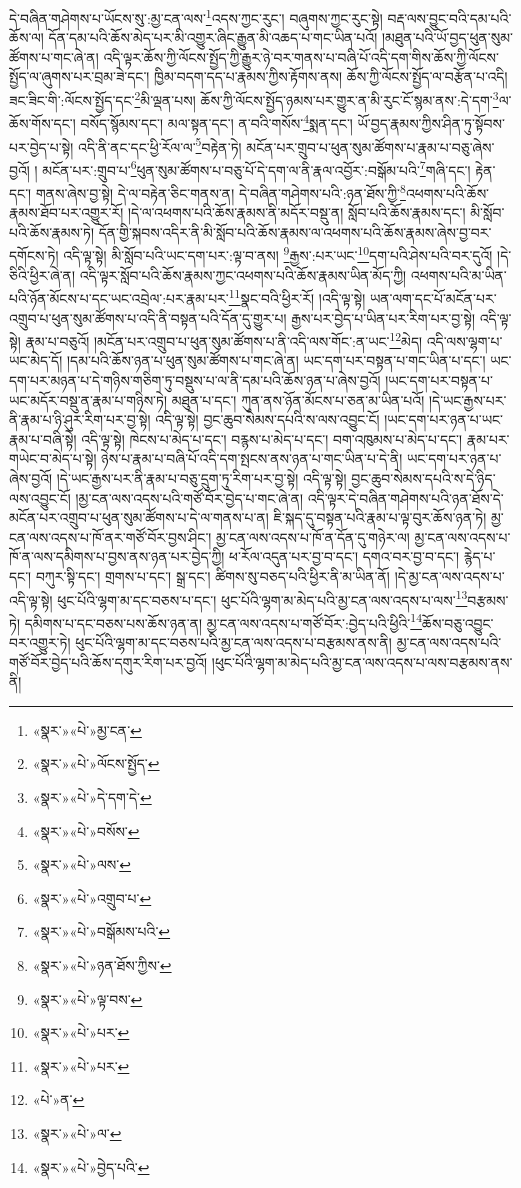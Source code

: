དེ་བཞིན་གཤེགས་པ་ཡོངས་སུ་:མྱ་ངན་ལས་\footnote{«སྣར་»«པེ་»མྱ་ངན་}འདས་ཀྱང་རུང་། བཞུགས་ཀྱང་རུང་སྟེ། བརྡ་ལས་བྱུང་བའི་དམ་པའི་ཆོས་ལ། དོན་དམ་པའི་ཆོས་མེད་པར་མི་འགྱུར་ཞིང་རྒྱུན་མི་འཆད་པ་གང་ཡིན་པའོ། །མཐུན་པའི་ཡོ་བྱད་ཕུན་སུམ་ཚོགས་པ་གང་ཞེ་ན། འདི་ལྟར་ཆོས་ཀྱི་ལོངས་སྤྱོད་ཀྱི་རྒྱུར་ཉེ་བར་གནས་པ་བཞི་པོ་འདི་དག་གིས་ཆོས་ཀྱི་ལོངས་སྤྱོད་ལ་ཞུགས་པར་བྲམ་ཟེ་དང་། ཁྱིམ་བདག་དད་པ་རྣམས་ཀྱིས་རྟོགས་ནས། ཆོས་ཀྱི་ལོངས་སྤྱོད་ལ་བརྩོན་པ་འདི། ཟང་ཟིང་གི་:ལོངས་སྤྱོད་དང་\footnote{«སྣར་»«པེ་»ལོངས་སྤྱོད་}མི་ལྡན་པས། ཆོས་ཀྱི་ལོངས་སྤྱོད་ཉམས་པར་གྱུར་ན་མི་རུང་ངོ་སྙམ་ནས་:དེ་དག་\footnote{«སྣར་»«པེ་»དེ་དག་དེ་}ལ་ཆོས་གོས་དང་། བསོད་སྙོམས་དང་། མལ་སྟན་དང་། ན་བའི་གསོས་\footnote{«སྣར་»«པེ་»བསོས་}སྨན་དང་། ཡོ་བྱད་རྣམས་ཀྱིས་ཤིན་ཏུ་སྟོབས་པར་བྱེད་པ་སྟེ། འདི་ནི་ནང་དང་ཕྱི་རོལ་ལ་\footnote{«སྣར་»«པེ་»ལས་}བརྟེན་ཏེ། མངོན་པར་གྲུབ་པ་ཕུན་སུམ་ཚོགས་པ་རྣམ་པ་བཅུ་ཞེས་བྱའོ། །
མངོན་པར་:གྲུབ་པ་\footnote{«སྣར་»«པེ་»འགྲུབ་པ་}ཕུན་སུམ་ཚོགས་པ་བཅུ་པོ་དེ་དག་ལ་ནི་རྣལ་འབྱོར་:བསྒོམ་པའི་\footnote{«སྣར་»«པེ་»བསྒོམས་པའི་}གཞི་དང་། རྟེན་དང་། གནས་ཞེས་བྱ་སྟེ། དེ་ལ་བརྟེན་ཅིང་གནས་ན། དེ་བཞིན་གཤེགས་པའི་:ཉན་ཐོས་ཀྱི་\footnote{«སྣར་»«པེ་»ཉན་ཐོས་ཀྱིས་}འཕགས་པའི་ཆོས་རྣམས་ཐོབ་པར་འགྱུར་རོ། །དེ་ལ་འཕགས་པའི་ཆོས་རྣམས་ནི་མདོར་བསྡུ་ན། སློབ་པའི་ཆོས་རྣམས་དང་། མི་སློབ་པའི་ཆོས་རྣམས་ཏེ། དོན་གྱི་སྐབས་འདིར་ནི་མི་སློབ་པའི་ཆོས་རྣམས་ལ་འཕགས་པའི་ཆོས་རྣམས་ཞེས་བྱ་བར་དགོངས་ཏེ། འདི་ལྟ་སྟེ། མི་སློབ་པའི་ཡང་དག་པར་:ལྟ་བ་ནས། \footnote{«སྣར་»«པེ་»ལྟ་བས་}རྒྱས་:པར་ཡང་\footnote{«སྣར་»«པེ་»པར་}དག་པའི་ཤེས་པའི་བར་དུའོ། །དེ་ཅིའི་ཕྱིར་ཞེ་ན། འདི་ལྟར་སློབ་པའི་ཆོས་རྣམས་ཀྱང་འཕགས་པའི་ཆོས་རྣམས་ཡིན་མོད་ཀྱི། འཕགས་པའི་མ་ཡིན་པའི་ཉོན་མོངས་པ་དང་ཡང་འབྲེལ་:པར་རྣམ་པར་\footnote{«སྣར་»«པེ་»པར་}སྣང་བའི་ཕྱིར་རོ། །འདི་ལྟ་སྟེ། ཡན་ལག་དང་པོ་མངོན་པར་འགྲུབ་པ་ཕུན་སུམ་ཚོགས་པ་འདི་ནི་བསྟན་པའི་དོན་དུ་གྱུར་པ། རྒྱས་པར་བྱེད་པ་ཡིན་པར་རིག་པར་བྱ་སྟེ། འདི་ལྟ་སྟེ། རྣམ་པ་བཅུའོ། །མངོན་པར་འགྲུབ་པ་ཕུན་སུམ་ཚོགས་པ་ནི་འདི་ལས་གོང་:ན་ཡང་\footnote{«པེ་»ན་}མེད། འདི་ལས་ལྷག་པ་ཡང་མེད་དོ། །དམ་པའི་ཆོས་ཉན་པ་ཕུན་སུམ་ཚོགས་པ་གང་ཞེ་ན། ཡང་དག་པར་བསྟན་པ་གང་ཡིན་པ་དང་། ཡང་དག་པར་མཉན་པ་དེ་གཉིས་གཅིག་ཏུ་བསྡུས་པ་ལ་ནི་དམ་པའི་ཆོས་ཉན་པ་ཞེས་བྱའོ། །ཡང་དག་པར་བསྟན་པ་ཡང་མདོར་བསྡུ་ན་རྣམ་པ་གཉིས་ཏེ། མཐུན་པ་དང་། ཀུན་ནས་ཉོན་མོངས་པ་ཅན་མ་ཡིན་པའོ། །དེ་ཡང་རྒྱས་པར་ནི་རྣམ་པ་ཉི་ཤུར་རིག་པར་བྱ་སྟེ། འདི་ལྟ་སྟེ། བྱང་ཆུབ་སེམས་དཔའི་ས་ལས་འབྱུང་ངོ། །ཡང་དག་པར་ཉན་པ་ཡང་རྣམ་པ་བཞི་སྟེ། འདི་ལྟ་སྟེ། ཁེངས་པ་མེད་པ་དང་། བརྙས་པ་མེད་པ་དང་། བག་འཁུམས་པ་མེད་པ་དང་། རྣམ་པར་གཡེང་བ་མེད་པ་སྟེ། ཉེས་པ་རྣམ་པ་བཞི་པོ་འདི་དག་སྤངས་ནས་ཉན་པ་གང་ཡིན་པ་དེ་ནི། ཡང་དག་པར་ཉན་པ་ཞེས་བྱའོ། །དེ་ཡང་རྒྱས་པར་ནི་རྣམ་པ་བཅུ་དྲུག་ཏུ་རིག་པར་བྱ་སྟེ། འདི་ལྟ་སྟེ། བྱང་ཆུབ་སེམས་དཔའི་ས་དེ་ཉིད་ལས་འབྱུང་ངོ། །མྱ་ངན་ལས་འདས་པའི་གཙོ་བོར་བྱེད་པ་གང་ཞེ་ན། འདི་ལྟར་དེ་བཞིན་གཤེགས་པའི་ཉན་ཐོས་དེ་མངོན་པར་འགྲུབ་པ་ཕུན་སུམ་ཚོགས་པ་དེ་ལ་གནས་པ་ན། ཇི་སྐད་དུ་བསྟན་པའི་རྣམ་པ་ལྟ་བུར་ཆོས་ཉན་ཏེ། མྱ་ངན་ལས་འདས་པ་ཁོ་ནར་གཙོ་བོར་བྱས་ཤིང་། མྱ་ངན་ལས་འདས་པ་ཁོ་ན་དོན་དུ་གཉེར་ལ། མྱ་ངན་ལས་འདས་པ་ཁོ་ན་ལས་དམིགས་པ་བྱས་ནས་ཉན་པར་བྱེད་ཀྱི། ཕ་རོལ་འདུན་པར་བྱ་བ་དང་། དགའ་བར་བྱ་བ་དང་། རྙེད་པ་དང་། བཀུར་སྟི་དང་། གྲགས་པ་དང་། སྒྲ་དང་། ཚིགས་སུ་བཅད་པའི་ཕྱིར་ནི་མ་ཡིན་ནོ། །དེ་མྱ་ངན་ལས་འདས་པ་འདི་ལྟ་སྟེ། ཕུང་པོའི་ལྷག་མ་དང་བཅས་པ་དང་། ཕུང་པོའི་ལྷག་མ་མེད་པའི་མྱ་ངན་ལས་འདས་པ་ལས་\footnote{«སྣར་»«པེ་»ལ་}བརྩམས་ཏེ། དམིགས་པ་དང་བཅས་པས་ཆོས་ཉན་ན། མྱ་ངན་ལས་འདས་པ་གཙོ་བོར་:བྱེད་པའི་ཕྱིའི་\footnote{«སྣར་»«པེ་»བྱེད་པའི་}ཆོས་བཅུ་འབྱུང་བར་འགྱུར་ཏེ། ཕུང་པོའི་ལྷག་མ་དང་བཅས་པའི་མྱ་ངན་ལས་འདས་པ་བརྩམས་ནས་ནི། མྱ་ངན་ལས་འདས་པའི་གཙོ་བོར་བྱེད་པའི་ཆོས་དགུར་རིག་པར་བྱའོ། །ཕུང་པོའི་ལྷག་མ་མེད་པའི་མྱ་ངན་ལས་འདས་པ་ལས་བརྩམས་ནས་ནི། 